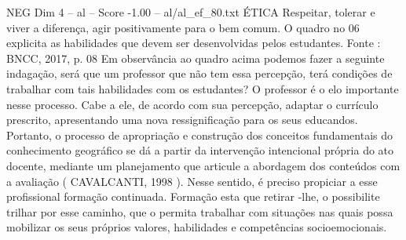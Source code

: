 \begin{textsample}{NEG Dim 4 – al – Score -1.00 – al/al\_ef\_80.txt}
ÉTICA Respeitar, tolerar e viver a diferença, agir positivamente para o bem comum.
O quadro no 06 explicita as habilidades que devem ser desenvolvidas pelos estudantes.
Fonte : BNCC, 2017, p. 08 Em observância ao quadro acima podemos fazer a seguinte indagação, será que um professor que não tem essa percepção, terá condições de trabalhar com tais habilidades com os estudantes?
O professor é o elo importante nesse processo.
Cabe a ele, de acordo com sua percepção, adaptar o currículo prescrito, apresentando uma nova ressignificação para os seus educandos.
Portanto, o processo de apropriação e construção dos conceitos fundamentais do conhecimento geográfico se dá a partir da intervenção intencional própria do ato docente, mediante um planejamento que articule a abordagem dos conteúdos com a avaliação ( CAVALCANTI, 1998 ).
Nesse sentido, é preciso propiciar a esse profissional formação continuada.
Formação esta que retirar -lhe, o possibilite trilhar por esse caminho, que o permita trabalhar com situações nas quais possa mobilizar os seus próprios valores, habilidades e competências socioemocionais.

\end{textsample}
